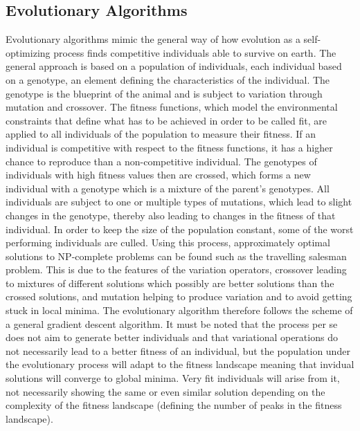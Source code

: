 \documentclass[main]{subfiles}
\begin{document}
\subsection{Evolutionary Algorithms}

Evolutionary algorithms mimic the general way of how evolution as a self-optimizing process finds competitive individuals able to survive on earth. %
%
The general approach is based on a population of individuals, each individual based on a genotype, an element defining the characteristics of the individual. %
%
The genotype is the blueprint of the animal and is subject to variation through mutation and crossover. %
%
The fitness functions, which model the environmental constraints that define what has to be achieved in order to be called fit, are applied to all individuals of the population to measure their fitness. %
%
If an individual is competitive with respect to the fitness functions, it has a higher chance to reproduce than a non-competitive individual. %
%
The genotypes of individuals with high fitness values then are crossed, which forms a new individual with a genotype which is a mixture of the parent's genotypes. %
%
All individuals are subject to one or multiple types of mutations, which lead to slight changes in the genotype, thereby also leading to changes in the fitness of that individual. %
%
In order to keep the size of the population constant, some of the worst performing individuals are culled. Using this process, approximately optimal solutions to NP-complete problems can be found such as the travelling salesman problem. %
%
This is due to the features of the variation operators, crossover leading to mixtures of different solutions which possibly are better solutions than the crossed solutions, and mutation helping to produce variation and to avoid getting stuck in local minima. %
%
The evolutionary algorithm therefore follows the scheme of a general gradient descent algorithm. %
%
It must be noted that the process per se does not aim to generate better individuals and that variational operations do not necessarily lead to a better fitness of an individual, but the population under the evolutionary process will adapt to the fitness landscape meaning that invidual solutions will converge to global minima. %
%
Very fit individuals will arise from it, not necessarily showing the same or even similar solution depending on the complexity of the fitness landscape (defining the number of peaks in the fitness landscape). 
\end{document}
